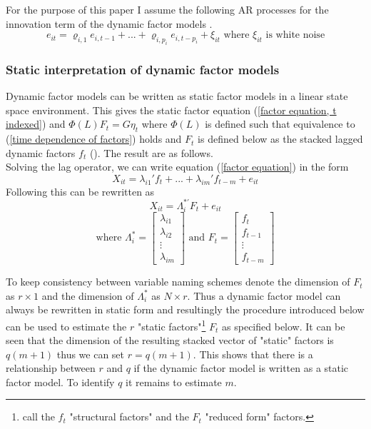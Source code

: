 \documentclass[12pt]{article}
\begin{document}
For the purpose of this paper I assume the following AR processes for the innovation term of the dynamic factor models \citep{breitung2011testing}.
\begin{equation}
	\label{AR process innovation term}
	e_{it} = \varrho_{i,1} e_{i, t-1} + ... + \varrho_{i, p_i} e_{i, t-p_i} + \xi_{it} \text{ where $\xi_{it}$ is white noise}
\end{equation}


\subsubsection{Static interpretation of dynamic factor models}
\label{static interpretation of Dynamic factor models}
Dynamic factor models can be written as static factor models in a linear state space environment. This gives the static factor equation (\ref{factor equation, t indexed}) and $\Phi(L) F_t = G \eta_t$ where $\Phi(L)$ is defined such that equivalence to (\ref{time dependence of factors}) holds and $F_t$ is defined below as the stacked lagged dynamic factors $f_t$ (\citet{stock2011dynamic}). The result are as follows. \\

Solving the lag operator, we can write equation (\ref{factor equation}) in the form 
\begin{equation}
	\label{factor equation, solved lag polynomial}
	X_{it} = \lambda_{i1}' f_t + ... + \lambda_{im}' f_{t-m} + e_{it}
\end{equation}
Following \citet{bai2002determining} this can be rewritten as 
$$X_{it} = \Lambda_i^{*'} F_t + e_{it}$$
$$\text{where } \Lambda_i^* = \begin{bmatrix} \lambda_{i1} \\ \lambda_{i2} \\ \vdots \\ \lambda_{im} \end{bmatrix} \text{ and } F_t = \begin{bmatrix} f_t \\ f_{t-1} \\ \vdots \\ f_{t-m} \end{bmatrix}$$

To keep consistency between variable naming schemes denote the dimension of $F_t$ as $r \times 1$ and the dimension of $\Lambda_i^*$ as $N \times r$. Thus a dynamic factor model can always be rewritten in static form and resultingly the procedure introduced below can be used to estimate the $r$ "static factors"\footnote{\citet{breitung2004identification} call the $f_t$ "structural factors" and the $F_t$ "reduced form" factors.} $F_t$ as specified below.
It can be seen that the dimension of the resulting stacked vector of "static" factors is $q(m+1)$ thus we can set $r=q(m+1)$. This shows that there is a relationship between $r$ and $q$ if the dynamic factor model is written as a static factor model. To identify $q$ it remains to estimate $m$.
\end{document}
